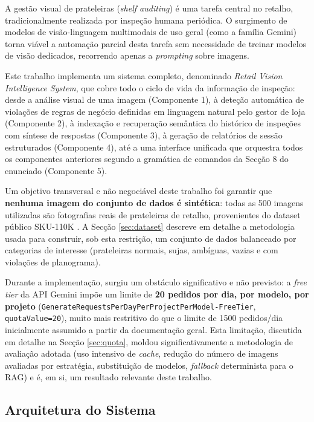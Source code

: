 \documentclass[conference]{IEEEtran}
\begin{document}
A gestão visual de prateleiras (\textit{shelf auditing}) é uma tarefa
central no retalho, tradicionalmente realizada por inspeção humana
periódica. O surgimento de modelos de visão-linguagem multimodais de uso
geral (como a família Gemini) torna viável a automação parcial desta tarefa
sem necessidade de treinar modelos de visão dedicados, recorrendo apenas a
\textit{prompting} sobre imagens.

Este trabalho implementa um sistema completo, denominado \textit{Retail
Vision Intelligence System}, que cobre todo o ciclo de vida da informação de
inspeção: desde a análise visual de uma imagem (Componente 1), à deteção
automática de violações de regras de negócio definidas em linguagem natural
pelo gestor de loja (Componente 2), à indexação e recuperação semântica do
histórico de inspeções com síntese de respostas (Componente 3), à geração de
relatórios de sessão estruturados (Componente 4), até a uma interface
unificada que orquestra todos os componentes anteriores segundo a gramática
de comandos da Secção 8 do enunciado (Componente 5).

Um objetivo transversal e não negociável deste trabalho foi garantir que
\textbf{nenhuma imagem do conjunto de dados é sintética}: todas as 500
imagens utilizadas são fotografias reais de prateleiras de retalho,
provenientes do dataset público SKU-110K \cite{sku110k}. A Secção
\ref{sec:dataset} descreve em detalhe a metodologia usada para construir,
sob esta restrição, um conjunto de dados balanceado por categorias de
interesse (prateleiras normais, sujas, ambíguas, vazias e com violações de
planograma).

Durante a implementação, surgiu um obstáculo significativo e não previsto: a
\textit{free tier} da API Gemini impõe um limite de \textbf{20 pedidos por
dia, por modelo, por projeto} (\texttt{GenerateRequestsPerDayPerProjectPer\-Model-FreeTier},
\texttt{quotaValue=20}), muito mais restritivo do que o limite de 1500
pedidos/dia inicialmente assumido a partir da documentação geral. Esta
limitação, discutida em detalhe na Secção \ref{sec:quota}, moldou
significativamente a metodologia de avaliação adotada (uso intensivo de
\textit{cache}, redução do número de imagens avaliadas por estratégia,
substituição de modelos, \textit{fallback} determinista para o RAG) e é, em
si, um resultado relevante deste trabalho.

\subsection{Arquitetura do Sistema}
\end{document}
